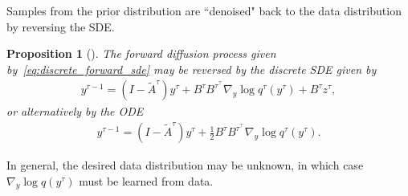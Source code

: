 \documentclass[letterpaper, 10 pt, conference]{IEEEconf}
\newtheorem{proposition}{Proposition}
\begin{document}
Samples from the prior distribution are ``denoised" back to the data distribution by reversing the SDE.
\begin{proposition} [\cite{song2020score, yang2023diffusion}] \label{prop:reverse_sde}
% 
    The forward diffusion process given by~\eqref{eq:discrete_forward_sde}
    may be reversed by the discrete SDE given by
    \begin{align}
        y^{\tau-1} = (I - \tilde{A}^{\tau}) y^{\tau} + B^{\tau} B^{{\tau}^\top} \nabla_{y} \log{q^{\tau}(y^{\tau})} + B^{\tau} z^{\tau},
    \end{align}
    or alternatively by the ODE
    \begin{align}
        y^{\tau-1} = (I - \tilde{A}^{\tau}) y^{\tau} + \frac{1}{2} B^{\tau} B^{{\tau}^\top} \nabla_{y} \log{q^{\tau}(y^{\tau})}.
    \end{align}
\end{proposition}
In general, the desired data distribution may be unknown, in which case $\nabla_{y} \log{q(y^{\tau})}$ must be learned from data.
\end{document}
